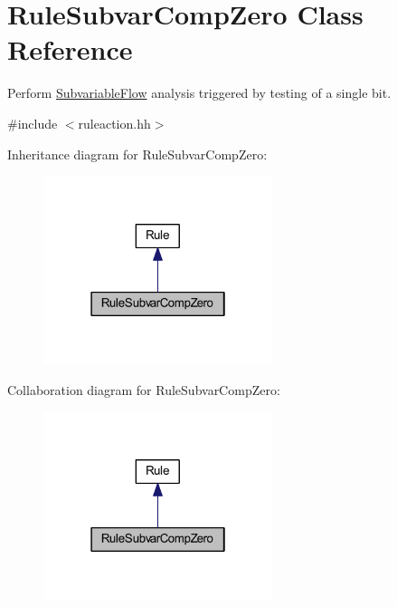 \hypertarget{class_rule_subvar_comp_zero}{}\section{Rule\+Subvar\+Comp\+Zero Class Reference}
\label{class_rule_subvar_comp_zero}


Perform \mbox{\hyperlink{class_subvariable_flow}{Subvariable\+Flow}} analysis triggered by testing of a single bit.  




{\ttfamily \#include $<$ruleaction.\+hh$>$}



Inheritance diagram for Rule\+Subvar\+Comp\+Zero\+:
\nopagebreak
\begin{figure}[H]
\begin{center}
\leavevmode
\includegraphics[width=190pt]{class_rule_subvar_comp_zero__inherit__graph}
\end{center}
\end{figure}


Collaboration diagram for Rule\+Subvar\+Comp\+Zero\+:
\nopagebreak
\begin{figure}[H]
\begin{center}
\leavevmode
\includegraphics[width=190pt]{class_rule_subvar_comp_zero__coll__graph}
\end{center}
\end{figure}
